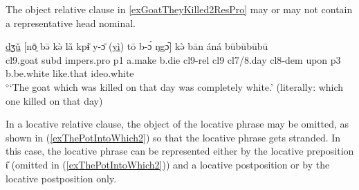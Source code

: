 \documentclass[10pt,twoside]{article}
\def\ci#1{{\ipaFont #1}}
\newcommand{\gl}[1]{`#1'}
\def\VSP{\vspace{0pt}}
\newcommand{\cl}[1]{{\sc cl#1}}
\newcommand{\pref}[1]{(\ref{#1})}
\def\elicited{$^\diamond$}
\def\ih{ɩ}
\newcommand{\comment}[1]{\textcolor{blue}{\emph{#1}}}
\begin{document}
The object relative clause in \ref{exGoatTheyKilled2ResPro} may or may not contain a representative head nominal.
%
%

\begin{exe} 
	\ex \label{exGoatTheyKilled2ResPro}	

		\gll	\uline{dʒǔ} [nō̤ bə̄ kə̀ lǎ kpɨ̄ y-ɔ̄ (\uline{yì}) tō b-ɔ́ ŋgɔ᷆] kə̀ bān áná būbūbūbū			\\
			\cl9.goat {\sc subd} {\sc impers.pro} {\sc p1} a.make b.die \cl9-{\sc rel} \cl9  \cl7/8.day \cl8-{\sc dem} upon {\sc p3} b.be.white like.that {\sc ideo}.white		\\
		\glt \VSP \elicited \gl{The goat which was killed on that day was completely white.} (literally: which one killed on that day)
\end{exe}%

In a locative relative clause, the object of the locative phrase may be omitted, as 
shown in \pref{exThePotIntoWhich2} so that the locative phrase 
gets stranded. In this case, the locative phrase can be represented either by the locative 
preposition \ci{\H\ih} (omitted in \pref{exThePotIntoWhich2}) and a locative postposition or by the locative postposition only.

%
\end{document}
